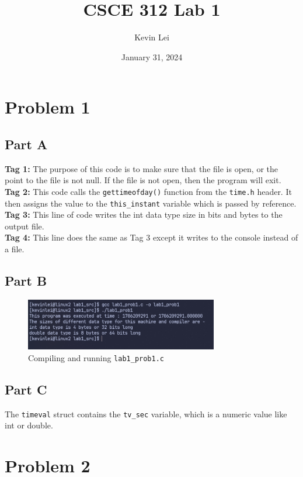 \documentclass{article}
\title{CSCE 312 Lab 1}
\author{Kevin Lei}
\date{January 31, 2024}
\begin{document}
\maketitle

\section{Problem 1}

\subsection{Part A}
\textbf{Tag 1: } The purpose of this code is to make sure that the file is open, or the point to the file is not null. 
If the file is not open, then the program will exit.\\
\textbf{Tag 2: } This code calls the \lstinline!gettimeofday()! function from the \lstinline!time.h! header.
It then assigns the value to the \lstinline!this_instant! variable which is passed by reference. \\
\textbf{Tag 3: } This line of code writes the int data type size in bits and bytes to the output file. \\
\textbf{Tag 4: } This line does the same as Tag 3 except it writes to the console instead of a file. \\

\subsection{Part B}
\begin{figure}[H]
    \centering
    \includegraphics[width=0.75\textwidth]{./images/prob1partb.png}
    \caption{Compiling and running \lstinline!lab1_prob1.c!}
\end{figure}

\subsection{Part C}
The \lstinline!timeval! struct contains the \lstinline!tv_sec! variable, which is a numeric value like int or double.

\newpage
\section{Problem 2}
\end{document}
